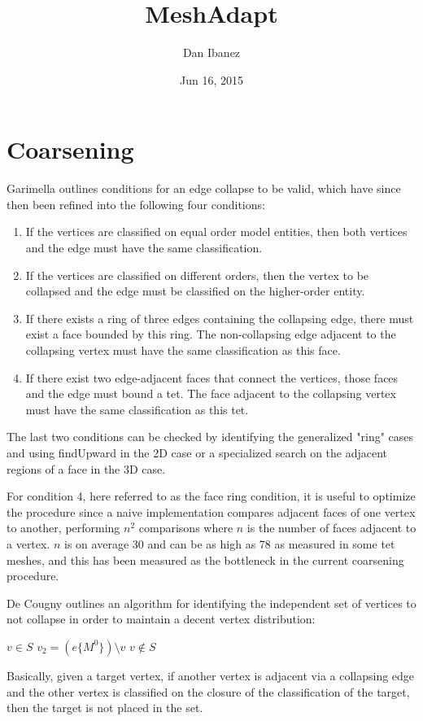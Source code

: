 \documentclass{article}
\title{MeshAdapt}
\author{Dan Ibanez}
\date{Jun 16, 2015}
\begin{document}
\maketitle

\section{Coarsening}

Garimella outlines conditions for an
edge collapse to be valid, which have since then been refined
into the following four conditions:

\begin{enumerate}
\item If the vertices are classified on equal order model entities,
then both vertices and the edge must have the same classification.
\item If the vertices are classified on different orders, then
the vertex to be collapsed and the edge must be classified on
the higher-order entity.
\item If there exists a ring of three edges containing the
collapsing edge, there must exist a face bounded by this ring.
The non-collapsing edge adjacent to the collapsing vertex
must have the same classification as this face.
\item If there exist two edge-adjacent faces that connect
the vertices, those faces and the edge must bound a tet.
The face adjacent to the collapsing vertex must
have the same classification as this tet.
\end{enumerate}

The last two conditions can be checked by identifying the generalized
"ring" cases and using findUpward in the 2D case or a specialized
search on the adjacent regions of a face in the 3D case.

For condition 4, here referred to as the face ring condition,
it is useful to optimize the procedure since a naive implementation
compares adjacent faces of one vertex to another, performing $n^2$
comparisons where $n$ is the number of faces adjacent to a vertex.
$n$ is on average 30 and can be as high as 78 as measured in some tet
meshes, and this has been measured as the bottleneck in the current
coarsening procedure.

De Cougny outlines an algorithm for identifying the independent set
of vertices to not collapse in order to maintain a decent vertex
distribution:
\begin{algorithmic}
\State $v \in S$
\State $v_2 = (e\{M^0\})\setminus v$
\State $v\not\in S$
\EndIf
\EndIf
\EndIf
\EndFor
\EndFor
\EndFor
\end{algorithmic}
Basically, given a target vertex, if another vertex is adjacent via
a collapsing edge and the other vertex is classified on the closure
of the classification of the target, then the target is not placed
in the set.
\end{document}
